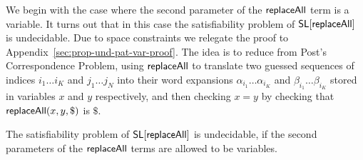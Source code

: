 %
%
%
%

We begin with the case where the second parameter of the $\mathsf{replaceAll}$ term is a variable. It turns out that in this case the satisfiability problem of $\mathsf{SL}[\mathsf{replaceAll}]$ is undecidable.
Due to space constraints we relegate the proof to Appendix~\ref{sec:prop-und-pat-var-proof}.
The idea is to reduce from Post's Correspondence Problem, using $\mathsf{replaceAll}$ to translate two guessed sequences of indices $i_1\ldots i_K$ and $j_1\ldots j_N$ into their word expansions $\alpha _{{i_{1}}}\ldots \alpha _{{i_{K}}}$ and $\beta _{{i_{1}}}\ldots \beta _{{i_{K}}}$ stored in variables $x$ and $y$ respectively, and then checking $x = y$ by checking that $\mathsf{replaceAll}(x, y, \$)$ is $\$$.

\begin{proposition}\label{prop-und-pat-var}
The satisfiability problem of $\mathsf{SL}[\mathsf{replaceAll}]$ is undecidable, if the second parameters of the $\mathsf{replaceAll}$ terms are allowed to be variables.
\end{proposition}


